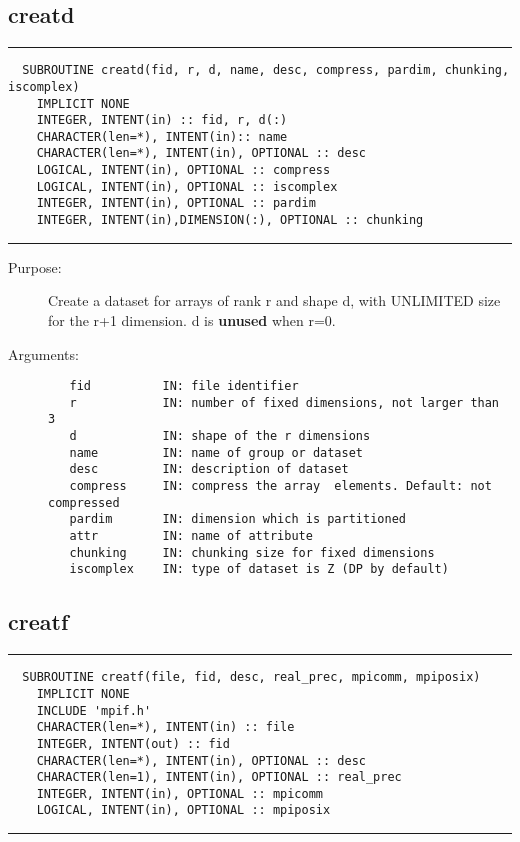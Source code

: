 \documentclass[a4paper]{article}
\begin{document}
\subsection{creatd}

\par
\addvspace{\medskipamount}
\nopagebreak\hrule
\begin{verbatim}
  SUBROUTINE creatd(fid, r, d, name, desc, compress, pardim, chunking, iscomplex)
    IMPLICIT NONE
    INTEGER, INTENT(in) :: fid, r, d(:)
    CHARACTER(len=*), INTENT(in):: name
    CHARACTER(len=*), INTENT(in), OPTIONAL :: desc
    LOGICAL, INTENT(in), OPTIONAL :: compress
    LOGICAL, INTENT(in), OPTIONAL :: iscomplex
    INTEGER, INTENT(in), OPTIONAL :: pardim
    INTEGER, INTENT(in),DIMENSION(:), OPTIONAL :: chunking
\end{verbatim}
\nopagebreak\hrule
\addvspace{\medskipamount}

\begin{description}
\item[Purpose:] \mbox{}

Create a dataset for arrays of rank r and shape d, with UNLIMITED size
for the r+1 dimension. d is {\bfseries unused} when r=0.



\item[Arguments:] \mbox{}

\begin{verbatim}
   fid          IN: file identifier
   r            IN: number of fixed dimensions, not larger than 3
   d            IN: shape of the r dimensions
   name         IN: name of group or dataset
   desc         IN: description of dataset
   compress     IN: compress the array  elements. Default: not compressed
   pardim       IN: dimension which is partitioned
   attr         IN: name of attribute
   chunking     IN: chunking size for fixed dimensions
   iscomplex    IN: type of dataset is Z (DP by default)

\end{verbatim}


\end{description}





\subsection{creatf}

\par
\addvspace{\medskipamount}
\nopagebreak\hrule
\begin{verbatim}
  SUBROUTINE creatf(file, fid, desc, real_prec, mpicomm, mpiposix)
    IMPLICIT NONE
    INCLUDE 'mpif.h'
    CHARACTER(len=*), INTENT(in) :: file
    INTEGER, INTENT(out) :: fid
    CHARACTER(len=*), INTENT(in), OPTIONAL :: desc
    CHARACTER(len=1), INTENT(in), OPTIONAL :: real_prec
    INTEGER, INTENT(in), OPTIONAL :: mpicomm
    LOGICAL, INTENT(in), OPTIONAL :: mpiposix
\end{verbatim}
\nopagebreak\hrule
\addvspace{\medskipamount}
\end{document}
